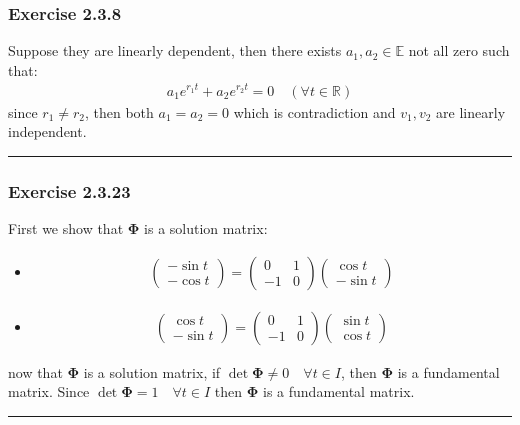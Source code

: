 \documentclass[12pt, letterpaper]{scrartcl}
\newcommand{\R}{\mathbb{R}}
\begin{document}
\subsubsection*{Exercise 2.3.8}
Suppose they are linearly dependent, then there exists $a_1, a_2\in \mathbb{E}$ not all zero such that:
\begin{align*}
    a_1e^{r_1t}+a_2e^{r_2t}=0 \quad (\forall t\in\R)
\end{align*}
since $r_1\neq r_2$, then both $a_1=a_2=0$ which is contradiction and $v_1, v_2$ are linearly independent.
\vskip1mm\hrule

\subsubsection*{Exercise 2.3.23}
First we show that $\bm\Phi$ is a solution matrix:
\begin{itemize}
    \item
    \begin{align*}
        \left( \begin{array}{c} -\sin t \\ -\cos t  \end{array}\right)=
        \left( \begin{array}{cc} 0 & 1 \\ -1 & 0  \end{array}\right)
        \left( \begin{array}{c} \cos t \\ -\sin t  \end{array}\right)
    \end{align*}
    \item 
    \begin{align*}
        \left( \begin{array}{c} \cos t \\ -\sin t  \end{array}\right)=
        \left( \begin{array}{cc} 0 & 1 \\ -1 & 0  \end{array}\right)
        \left( \begin{array}{c} \sin t \\ \cos t  \end{array}\right)
    \end{align*}
\end{itemize}
now that $\bm\Phi$ is a solution matrix, if $\det\bm\Phi\neq0\quad\forall t\in I$, then $\bm\Phi$ is a fundamental matrix. Since $\det\bm\Phi=1\quad\forall t\in I$ then $\bm\Phi$ is a fundamental matrix.
\vskip1mm\hrule
\end{document}
